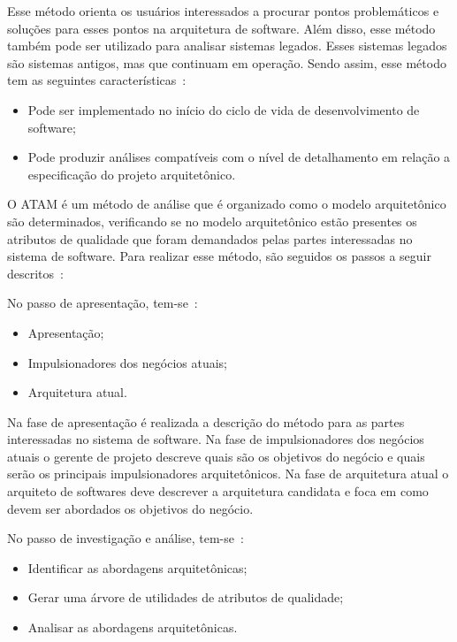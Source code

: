 Esse método orienta os usuários interessados a procurar pontos problemáticos e soluções para esses pontos na arquitetura de software. Além disso, esse método também pode ser utilizado para analisar sistemas legados. Esses sistemas legados são sistemas antigos, mas que continuam em operação. Sendo assim, esse método tem as seguintes características~\cite{ATAM}:

\begin{itemize}
    \item Pode ser implementado no início do ciclo de vida de desenvolvimento de software;
    \item Pode produzir análises compatíveis com o nível de detalhamento em relação a especificação do projeto arquitetônico.  
\end{itemize}

O ATAM é um método de análise que é organizado como o modelo arquitetônico são determinados, verificando se no modelo arquitetônico estão presentes os atributos de qualidade que foram demandados pelas partes interessadas no sistema de software. Para realizar esse método, são  seguidos os passos a seguir descritos~\cite{ATAM}:

No passo de apresentação, tem-se~\cite{ATAM}:
\begin{itemize}
    \item Apresentação;
    \item Impulsionadores dos negócios atuais;
    \item Arquitetura atual.
\end{itemize}

Na fase de apresentação é realizada a descrição do método para as partes interessadas no sistema de software. Na fase de impulsionadores dos negócios atuais o gerente de projeto descreve quais são os objetivos do negócio e quais serão os principais impulsionadores arquitetônicos. Na fase de arquitetura atual o arquiteto de softwares deve descrever a arquitetura candidata e foca em como devem ser abordados os objetivos do negócio.

No passo de investigação e análise, tem-se~\cite{ATAM}:

\begin{itemize}
    \item Identificar as abordagens arquitetônicas;
    \item Gerar uma árvore de utilidades de atributos de qualidade;
    \item Analisar as abordagens arquitetônicas. 
    
\end{itemize}

